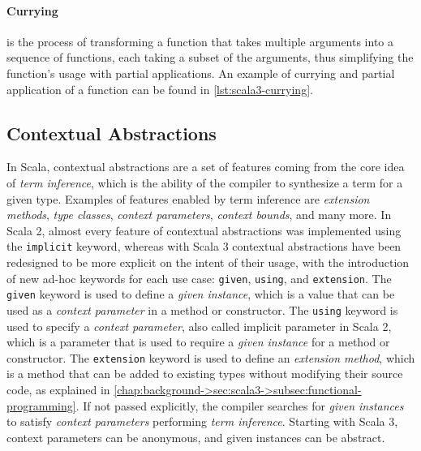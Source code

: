 

\paragraph{Currying} is the process of transforming a function that takes multiple arguments into a sequence of functions, each taking a subset of the arguments, thus simplifying the function's usage with partial applications.
%
An example of currying and partial application of a function can be found in \cref{lst:scala3-currying}.




\subsection{Contextual Abstractions} \label{chap:background->sec:scala3->subsec:contextual-abstractions}

In Scala, contextual abstractions are a set of features coming from the core idea of \textit{term inference}, which is the ability of the compiler to synthesize a  term for a given type.
%
Examples of features enabled by term inference are \textit{extension methods}, \textit{type classes}, \textit{context parameters}, \textit{context bounds}, and many more.
%
In Scala 2, almost every feature of contextual abstractions was implemented using the \texttt{implicit} keyword, whereas with Scala 3 contextual abstractions have been redesigned to be more explicit on the intent of their usage, with the introduction of new ad-hoc keywords for each use case: \texttt{given}, \texttt{using}, and \texttt{extension}.
%
The \texttt{given} keyword is used to define a \textit{given instance}, which is a value that can be used as a \textit{context parameter} in a method or constructor.
%
The \texttt{using} keyword is used to specify a \textit{context parameter}, also called implicit parameter in Scala 2, which is a parameter that is used to require a \textit{given instance} for a method or constructor.
%
The \texttt{extension} keyword is used to define an \textit{extension method}, which is a method that can be added to existing types without modifying their source code, as explained in \cref{chap:background->sec:scala3->subsec:functional-programming}.
%
If not passed explicitly, the compiler searches for \textit{given instances} to satisfy \textit{context parameters} performing \textit{term inference}.
%
Starting with Scala 3, context parameters can be anonymous, and given instances can be abstract.

